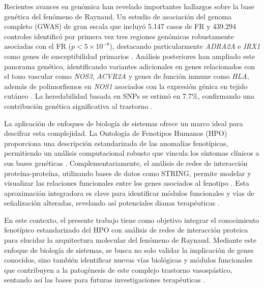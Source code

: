 Recientes avances en genómica han revelado importantes hallazgos sobre la base genética del fenómeno de Raynaud. Un estudio de asociación del genoma completo (GWAS) de gran escala que incluyó 5.147 casos de FR y 439.294 controles identificó por primera vez tres regiones genómicas robustamente asociadas con el FR ($p < 5 \times 10^{-8}$), destacando particularmente \textit{ADRA2A} e \textit{IRX1} como genes de susceptibilidad primarios \cite{Hartmann2023}. Análisis posteriores han ampliado este panorama genético, identificando variantes adicionales en genes relacionados con el tono vascular como \textit{NOS3}, \textit{ACVR2A} y genes de función inmune como \textit{HLA}, además de polimorfismos en \textit{NOS1} asociados con la expresión génica en tejido cutáneo \cite{deAlmeidaTervi2024, Smolina2018}. La heredabilidad basada en SNPs se estimó en 7.7\%, confirmando una contribución genética significativa al trastorno \cite{Hartmann2023}.

La aplicación de enfoques de biología de sistemas ofrece un marco ideal para descifrar esta complejidad. La Ontología de Fenotipos Humanos (HPO) proporciona una descripción estandarizada de las anomalías fenotípicas, permitiendo un análisis computacional robusto que vincula los síntomas clínicos a sus bases genéticas \cite{Khler2021, Robinson2008}. Complementariamente, el análisis de redes de interacción proteína-proteína, utilizando bases de datos como STRING, permite modelar y visualizar las relaciones funcionales entre los genes asociados al fenotipo \cite{Szklarczyk2025}. Esta aproximación integradora es clave para identificar módulos funcionales y vías de señalización alteradas, revelando así potenciales dianas terapéuticas \cite{Consortium}.

En este contexto, el presente trabajo tiene como objetivo integrar el conocimiento fenotípico estandarizado del HPO con análisis de redes de interacción proteica para elucidar la arquitectura molecular del fenómeno de Raynaud. Mediante este enfoque de biología de sistemas, se busca no solo validar la implicación de genes conocidos, sino también identificar nuevas vías biológicas y módulos funcionales que contribuyen a la patogénesis de este complejo trastorno vasospástico, sentando así las bases para futuras investigaciones terapéuticas \cite{Naylor2010, Fischer2025}.
